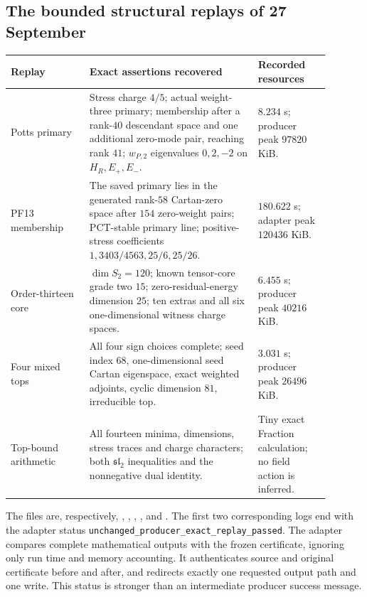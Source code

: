 \subsection{The bounded structural replays of 27 September}

\begin{longtable}{@{}p{0.22\linewidth}p{0.47\linewidth}p{0.2\linewidth}@{}}
\toprule
Replay&Exact assertions recovered&Recorded resources\\
\midrule\endhead
Potts primary&Stress charge $4/5$; actual weight-three primary;
membership after a rank-$40$ descendant space and one additional
zero-mode pair, reaching rank $41$; $w_{P,2}$ eigenvalues $0,2,-2$
on $H_R,E_+,E_-$.&$8.234$ s; producer peak $97820$ KiB.\\
PF13 membership&The saved primary lies in the generated rank-$58$
Cartan-zero space after $154$ zero-weight pairs; PCT-stable primary
line; positive-stress coefficients $1,3403/4563,25/6,25/26$.&
$180.622$ s; adapter peak $120436$ KiB.\\
Order-thirteen core&$\dim S_2=120$; known tensor-core grade two
$15$; zero-residual-energy dimension $25$; ten extras and all six
one-dimensional witness charge spaces.&$6.455$ s; producer peak
$40216$ KiB.\\
Four mixed tops&All four sign choices complete; seed index $68$,
one-dimensional seed Cartan eigenspace, exact weighted adjoints,
cyclic dimension $81$, irreducible top.&$3.031$ s; producer peak
$26496$ KiB.\\
Top-bound arithmetic&All fourteen minima, dimensions, stress traces
and charge characters; both $\mathfrak{sl}_2$ inequalities and the
nonnegative dual identity.&Tiny exact Fraction calculation;
no field action is inferred.\\
\bottomrule
\end{longtable}

The files are, respectively,
,
,
,
, and
.
The first two corresponding logs end with the adapter status
\texttt{unchanged\_producer\_exact\_replay\_passed}. The adapter
compares complete mathematical outputs with the frozen certificate,
ignoring only run time and memory accounting. It authenticates
source and original certificate before and after, and redirects
exactly one requested output path and one write. This status is
stronger than an intermediate producer success message.


